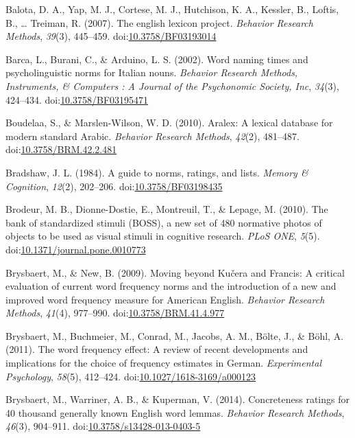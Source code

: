 \documentclass[english,man]{apa6}
\theoremstyle{definition}
\theoremstyle{definition}
\theoremstyle{definition}
\theoremstyle{remark}
\begin{document}
\hypertarget{ref-Balota2007}{}
Balota, D. A., Yap, M. J., Cortese, M. J., Hutchison, K. A., Kessler,
B., Loftis, B., \ldots{} Treiman, R. (2007). The english lexicon
project. \emph{Behavior Research Methods}, \emph{39}(3), 445--459.
doi:\href{https://doi.org/10.3758/BF03193014}{10.3758/BF03193014}

\hypertarget{ref-Barca2002}{}
Barca, L., Burani, C., \& Arduino, L. S. (2002). Word naming times and
psycholinguistic norms for Italian nouns. \emph{Behavior Research
Methods, Instruments, \& Computers : A Journal of the Psychonomic
Society, Inc}, \emph{34}(3), 424--434.
doi:\href{https://doi.org/10.3758/BF03195471}{10.3758/BF03195471}

\hypertarget{ref-Boudelaa2010}{}
Boudelaa, S., \& Marslen-Wilson, W. D. (2010). Aralex: A lexical
database for modern standard Arabic. \emph{Behavior Research Methods},
\emph{42}(2), 481--487.
doi:\href{https://doi.org/10.3758/BRM.42.2.481}{10.3758/BRM.42.2.481}

\hypertarget{ref-Bradshaw1984}{}
Bradshaw, J. L. (1984). A guide to norms, ratings, and lists.
\emph{Memory \& Cognition}, \emph{12}(2), 202--206.
doi:\href{https://doi.org/10.3758/BF03198435}{10.3758/BF03198435}

\hypertarget{ref-Brodeur2010}{}
Brodeur, M. B., Dionne-Dostie, E., Montreuil, T., \& Lepage, M. (2010).
The bank of standardized stimuli (BOSS), a new set of 480 normative
photos of objects to be used as visual stimuli in cognitive research.
\emph{PLoS ONE}, \emph{5}(5).
doi:\href{https://doi.org/10.1371/journal.pone.0010773}{10.1371/journal.pone.0010773}

\hypertarget{ref-Brysbaert2009}{}
Brysbaert, M., \& New, B. (2009). Moving beyond Kučera and Francis: A
critical evaluation of current word frequency norms and the introduction
of a new and improved word frequency measure for American English.
\emph{Behavior Research Methods}, \emph{41}(4), 977--990.
doi:\href{https://doi.org/10.3758/BRM.41.4.977}{10.3758/BRM.41.4.977}

\hypertarget{ref-Brysbaert2011}{}
Brysbaert, M., Buchmeier, M., Conrad, M., Jacobs, A. M., Bölte, J., \&
Böhl, A. (2011). The word frequency effect: A review of recent
developments and implications for the choice of frequency estimates in
German. \emph{Experimental Psychology}, \emph{58}(5), 412--424.
doi:\href{https://doi.org/10.1027/1618-3169/a000123}{10.1027/1618-3169/a000123}

\hypertarget{ref-Brysbaert2013}{}
Brysbaert, M., Warriner, A. B., \& Kuperman, V. (2014). Concreteness
ratings for 40 thousand generally known English word lemmas.
\emph{Behavior Research Methods}, \emph{46}(3), 904--911.
doi:\href{https://doi.org/10.3758/s13428-013-0403-5}{10.3758/s13428-013-0403-5}
\end{document}
